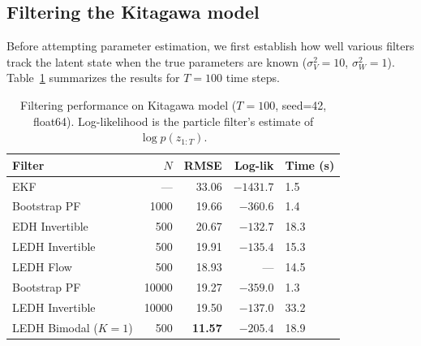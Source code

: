 \documentclass{article}
\begin{document}
\subsection{Filtering the Kitagawa model}

Before attempting parameter estimation, we first establish how well various filters track the latent state when the true parameters are known ($\sigma_V^2 = 10$, $\sigma_W^2 = 1$). Table~\ref{tab:kitagawa_filters} summarizes the results for $T = 100$ time steps.

\begin{table}[H]
\centering
\begin{tabular}{lrrrl}
\toprule
Filter & $N$ & RMSE & Log-lik & Time (s) \\
\midrule
EKF & --- & 33.06 & $-1431.7$ & 1.5 \\
Bootstrap PF & 1000 & 19.66 & $-360.6$ & 1.4 \\
EDH Invertible & 500 & 20.67 & $-132.7$ & 18.3 \\
LEDH Invertible & 500 & 19.91 & $-135.4$ & 15.3 \\
LEDH Flow & 500 & 18.93 & --- & 14.5 \\
Bootstrap PF & 10000 & 19.27 & $-359.0$ & 1.3 \\
LEDH Invertible & 10000 & 19.50 & $-137.0$ & 33.2 \\
\midrule
LEDH Bimodal ($K\!=\!1$) & 500 & \textbf{11.57} & $-205.4$ & 18.9 \\
\bottomrule
\end{tabular}
\caption{Filtering performance on Kitagawa model ($T=100$, seed=42, float64). Log-likelihood is the particle filter's estimate of $\log p(z_{1:T})$.}
\label{tab:kitagawa_filters}
\end{table}
\end{document}
